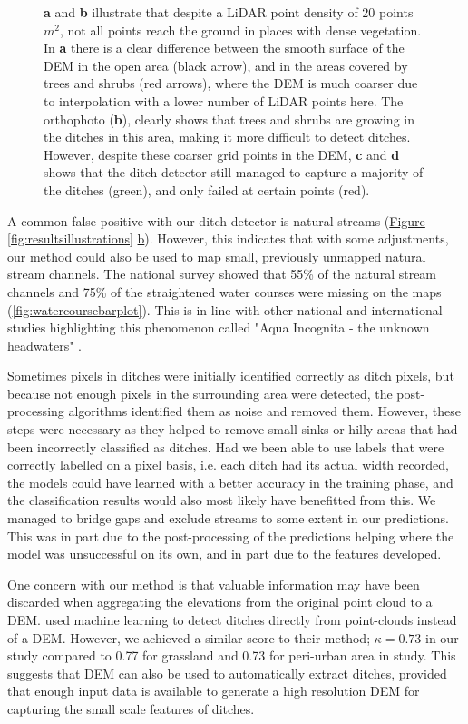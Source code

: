 \documentclass[11pt, review]{elsarticle} %
\begin{document}
\begin{figure}[!htb]
    \caption{\textbf{a} and \textbf{b} illustrate that despite a LiDAR point density of 20 points $m^2$, not all points reach the ground in places with dense vegetation. In \textbf{a} there is a clear difference between the smooth surface of the DEM in the open area (black arrow), and in the areas covered by trees and shrubs (red arrows), where the DEM is much coarser due to interpolation with a lower number of LiDAR points here. The orthophoto (\textbf{b}), clearly shows that trees and shrubs are growing in the ditches in this area, making it more difficult to detect ditches. However, despite these coarser grid points in the DEM, \textbf{c} and \textbf{d} shows that the ditch detector still managed to capture a majority of the ditches (green), and only failed at certain points (red).}
    \label{fig:resultstreesbushes}
\end{figure}

A common false positive with our ditch detector is natural streams (\hyperref[fig:resultsillustrations]{Figure} \ref{fig:resultsillustrations} \hyperref[fig:resultsillustrations]{b}). However, this indicates that with some adjustments, our method could also be used to map small, previously unmapped natural stream channels. The national survey showed that 55\% of the natural stream channels and 75\% of the straightened water courses were missing on the maps (\autoref{fig:watercoursebarplot}). This is in line with other national \citep{kuglerova} and international \citep{benstead} studies highlighting this phenomenon called "Aqua Incognita - the unknown headwaters" \citep{bishop,kuglerova}.

Sometimes pixels in ditches were initially identified correctly as ditch pixels, but because not enough pixels in the surrounding area were detected, the post-processing algorithms identified them as noise and removed them. However, these steps were necessary as they helped to remove small sinks or hilly areas that had been incorrectly classified as ditches. Had we been able to use labels that were correctly labelled on a pixel basis, i.e. each ditch had its actual width recorded, the models could have learned with a better accuracy in the training phase, and the classification results would also most likely have benefitted from this. We managed to bridge gaps and exclude streams to some extent in our predictions. This was in part due to the post-processing of the predictions helping where the model was unsuccessful on its own, and in part due to the features developed.

One concern with our method is that valuable information may have been discarded when aggregating the elevations from the original point cloud to a DEM. \citet{roelens} used  machine learning to detect ditches directly from point-clouds instead of a DEM. However, we achieved a similar score to their method; $\kappa=0.73$ in our study compared to 0.77 for grassland and 0.73 for peri-urban area in \citet{roelens} study. This suggests that DEM can also be used to automatically extract ditches, provided that enough input data is available to generate a high resolution DEM for capturing the small scale features of ditches. 
\end{document}
